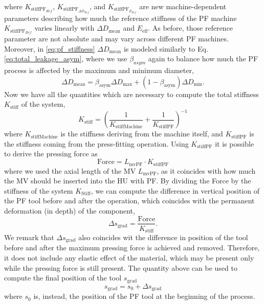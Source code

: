 where $K_{\text{stiffPF}_{Ref}}$, $K_{\text{stiffPF}_{\Delta D_{Ref}}}$, and $K_{\text{stiffPF}_{E_{Ref}}}$ are new machine-dependent parameters describing how much the reference stiffness of the PF machine $K_{\text{stiffPF}_{Ref}}$ varies linearly with $\Delta D_{\text{mean}}$ and $E_{\text{eff}}$. As before, those reference parameter are not absolute and may vary across different PF machines. Moreover, in \ref{eq:pf_stiffness} $\Delta D_{\text{mean}}$ is modeled similarly to Eq.\ref{eq:total_leakage_asym}, where we use $\beta_{asym}$ again to balance how much the PF process is affected by the maximum and minimum diameter,
\begin{equation}
    \Delta D_{\text{mean}} = \beta_{\text{asym}}\Delta D_{\text{max}} + (1 - \beta_{\text{asym}})\Delta D_{\text{min}}.
\end{equation}
Now we have all the quantities which are necessary to compute the total stiffness $K_{\text{stiff}}$ of the system,
\begin{equation}
    K_{\text{stiff}} = \left(\frac{1}{K_{\text{stiffMachine}}} + \frac{1}{K_{\text{stiffPF}}}\right)^{-1}
\end{equation}
where $K_{\text{stiffMachine}}$ is the stiffness deriving from the machine itself, and $K_{\text{stiffPF}}$ is the stiffness coming from the press-fitting operation.
Using $K_{\text{stiffPF}}$ it is possible to derive the pressing force as 
\begin{equation}
    \text{Force} = L_{\text{mvPF}} \cdot K_{\text{stiffPF}}
\end{equation}
where we used the axial length of the MV $L_{\text{mvPF}}$, as it coincides with how much the MV should be inserted into the HU with PF.
By dividing the Force by the stiffness of the system $K_{\text{Stiff}}$, we can compute the difference in vertical position of the PF tool before and after the operation, which coincides with the permanent deformation (in depth) of the component, 
\begin{equation}
    \Delta s_{\text{grad}} = \frac{\text{Force}}{K_{\text{stiff}}}.
\end{equation}
We remark that $\Delta s_{\text{grad}}$ also coincides wit the difference in position of the tool before and after the maximum pressing force is achieved and removed. Therefore, it does not include any elastic effect of the material, which may be present only while the pressing force is still present.
The quantity above can be used to compute the final position of the tool $s_{\text{grad}}$
\begin{equation}
    s_{\text{grad}} = s_0 + \Delta s_{\text{grad}}
\end{equation}
where $s_0$ is, instead, the position of the PF tool at the beginning of the process. 


